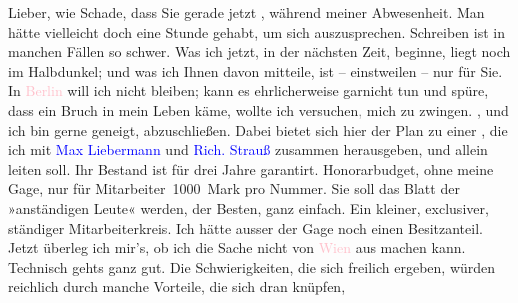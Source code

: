\pstart
           Lieber, wie Schade, dass Sie gerade jetzt \label{K_L03430-1v}\label{K_L03430-1h}, während meiner Abwesenheit. Man hätte vielleicht doch eine Stunde gehabt, um
               sich auszusprechen. Schreiben ist in manchen Fällen so schwer. Was ich jetzt, in der
               nächsten Zeit, beginne, liegt noch im Halbdunkel; und was ich Ihnen davon mitteile,
               ist – einstweilen – nur für Sie. In \textcolor{pink}{Berlin}{}\ledrightnote{\textcolor{pink}{Berlin}} will
               ich nicht bleiben; kann es ehrlicherweise garnicht tun und spüre, dass ein Bruch in
               mein Leben käme, wollte ich versuchen\textcolor{gray}{,} mich zu zwingen. \label{K_L03430-2v}\label{K_L03430-2h}, und ich bin gerne geneigt, abzuschließen. Dabei bietet sich
               hier der Plan zu einer \label{K_L03430-3v}\label{K_L03430-3h}, die ich mit \textcolor{blue}{Max Liebermann}{}\ledrightnote{\textcolor{blue}{Max Liebermann}}
               und \textcolor{blue}{Rich. Strauß}{}\ledrightnote{\textcolor{blue}{Richard Strauss}} zusammen herausgeben, und
               allein leiten soll. Ihr Bestand ist für drei Jahre garantirt. Honorarbudget, ohne
               meine Gage, nur für Mitarbeiter 1000 Mark pro Nummer. Sie soll das Blatt der
               »anständigen Leute« werden, der Besten, ganz einfach. Ein kleiner, exclusiver,
               ständiger Mitarbeiterkreis. Ich hätte ausser der Gage noch einen Besitzanteil. Jetzt
               überleg ich mir’s, ob ich die Sache nicht von \textcolor{pink}{Wien}{}\ledrightnote{\textcolor{pink}{Wien}}
               aus machen kann. Technisch gehts ganz gut. Die Schwierigkeiten, die sich freilich
               ergeben, würden reichlich durch manche Vorteile, {\pb}die sich dran knüpfen,
